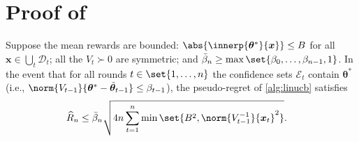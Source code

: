 \documentclass{article}
\renewcommand{\vec}[1]{\bm{#1}}
\newcommand{\inv}[1]{#1^{-1}}
\DeclarePairedDelimiter{\abs}||
\newcommand{\Dset}[1]{\mathcal{D}_{#1}}
\newcommand{\Eset}[1]{\mathcal{E}_{#1}}
\begin{document}
\section{Proof of }

\ThmLinUCBRegret*

\begin{lemma}\label{lemma:linucb-regret}
  Suppose the mean rewards are bounded:
  $\abs{\innerp{\vec\theta^*}{\vec x}} \le B$ for all $\vec x\in\bigcup_t\Dset{t}$;
  all the $V_t \succ 0$ are symmetric; and
  $\bar\beta_n \ge \max\set{\beta_0,\dotsc,\beta_{n-1},1}$.  In the
  event that for all rounds $t\in\set{1,\dotsc,n}$ the confidence sets
  $\Eset{t}$ contain $\vec\theta^*$ (i.e.,
  $\norm{V_{t-1}}{\vec\theta^* - \tilde{\vec\theta}_{t-1}} \le \beta_{t-1}$),
  the pseudo-regret of \cref{alg:linucb} satisfies
  \begin{align*}
    \widehat{R}_n &\le \bar\beta_n\sqrt{4n \sum_{t=1}^n \min\set{B^2,
                   \norm{\inv{V_{t-1}}}{\vec x_t}^2}}.
  \end{align*}
\end{lemma}
\end{document}
